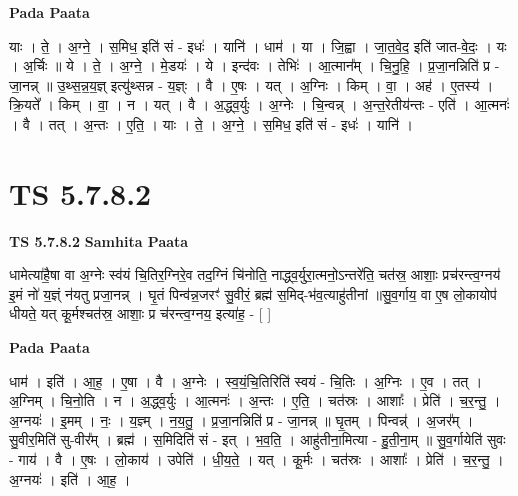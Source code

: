 \documentclass[17pt]{extarticle}
\begin{document}
\textbf{Pada Paata} \newline

याः । ते॒ । अ॒ग्ने॒ । स॒मिध॒ इति॑ सं - इधः॑ । यानि॑ । धाम॑ । या । जि॒ह्वा । जा॒त॒वे॒द॒ इति॑ जात-वे॒दः॒ । यः । अ॒र्चिः ॥ ये । ते॒ । अ॒ग्ने॒ । मे॒डयः॑ । ये । इन्द॑वः । तेभिः॑ । आ॒त्मान᳚म् । चि॒नु॒हि॒ । प्र॒जा॒नन्निति॑ प्र - जा॒नन्न् ॥ उ॒थ्स॒न्न॒य॒ज्ञ् इत्यु॑थ्सन्न - य॒ज्ञ्ः । वै । ए॒षः । यत् । अ॒ग्निः । किम् । वा॒ । अह॑ । ए॒तस्य॑ । क्रि॒यते᳚ । किम् । वा॒ । न । यत् । वै । अ॒द्ध्व॒र्युः । अ॒ग्नेः । चि॒न्वन्न् । अ॒न्त॒रेतीय॑न्तः - एति॑ । आ॒त्मनः॑ । वै । तत् । अ॒न्तः । ए॒ति॒ । याः । ते॒ । अ॒ग्ने॒ । स॒मिध॒ इति॑ सं - इधः॑ । यानि॑ ।  \newline





\section{ TS 5.7.8.2 }

\textbf{TS 5.7.8.2 } \newline
\textbf{Samhita Paata} \newline

धामेत्या॑है॒षा वा अ॒ग्नेः स्व॑यं चि॒तिर॒ग्निरे॒व तद॒ग्निं चि॑नोति॒ नाद्ध्व॒र्युरा॒त्मनो॒ऽन्तरे॑ति॒ चत॑स्र॒ आशाः॒ प्रच॑रन्त्व॒ग्नय॑ इ॒मं नो॑ य॒ज्ञ्ं न॑यतु प्रजा॒नन्न्  । घृ॒तं पिन्व॑न्न॒जरꣳ॑ सु॒वीरं॒ ब्रह्म॑ स॒मिद्-भ॑व॒त्याहु॑तीनां ॥सु॒व॒र्गाय॒ वा ए॒ष लो॒कायोप॑ धीयते॒ यत् कू॒र्मश्चत॑स्र॒ आशाः॒ प्र च॑रन्त्व॒ग्नय॒ इत्या॑ह॒ - [  ] \newline

\textbf{Pada Paata} \newline

धाम॑ । इति॑ । आ॒ह॒ । ए॒षा । वै । अ॒ग्नेः । स्व॒यं॒चि॒तिरिति॑ स्वयं - चि॒तिः । अ॒ग्निः । ए॒व । तत् । अ॒ग्निम् । चि॒नो॒ति । न । अ॒द्ध्व॒र्युः । आ॒त्मनः॑ । अ॒न्तः । ए॒ति॒ । चत॑स्रः । आशाः᳚ । प्रेति॑ । च॒र॒न्तु॒ । अ॒ग्नयः॑ । इ॒मम् । नः॒ । य॒ज्ञ्म् । न॒य॒तु॒ । प्र॒जा॒नन्निति॑ प्र - जा॒नन्न् ॥ घृ॒तम् । पिन्वन्न्॑ । अ॒जर᳚म् । सु॒वीर॒मिति॑ सु-वीर᳚म् । ब्रह्म॑ । स॒मिदिति॑ सं - इत् । भ॒व॒ति॒ । आहु॑तीना॒मित्या - हु॒ती॒ना॒म् ॥ सु॒व॒र्गायेति॑ सुवः - गाय॑ । वै । ए॒षः । लो॒काय॑ । उपेति॑ । धी॒य॒ते॒ । यत् । कू॒र्मः । चत॑स्रः । आशाः᳚ । प्रेति॑ । च॒र॒न्तु॒ । अ॒ग्नयः॑ । इति॑ । आ॒ह॒ ।  \newline




\end{document}

